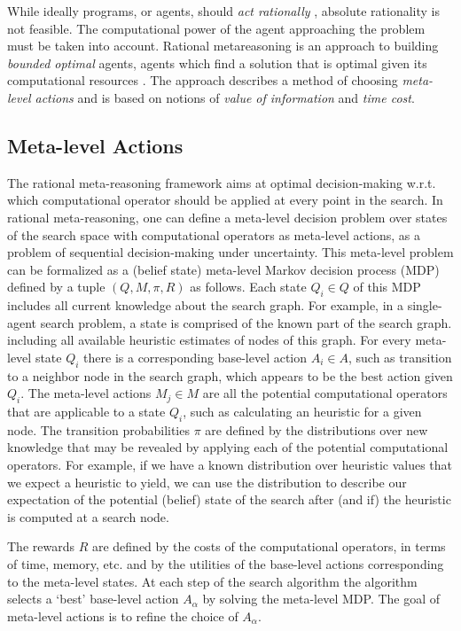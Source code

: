 While ideally programs, or agents, should {\em act rationally}
\cite{Russell.aima}, absolute rationality is not feasible. The
computational power of the agent approaching the problem must be taken
into account. Rational metareasoning \cite{Russell.right} is an
approach to building {\em bounded optimal} agents, agents which find a
solution that is optimal given its computational resources
\cite{Horvitz.reasoningabout}. The approach describes a method of
choosing {\em meta-level actions} and is based on notions of {\em
value of information} and {\em time cost}.

\subsection{Meta-level Actions}

The rational meta-reasoning framework aims at optimal
decision-making w.r.t. which computational operator should be applied
at every point in the search. In rational meta-reasoning, one can
define a meta-level decision problem over states of the search space
with computational operators as meta-level actions, as a problem of
sequential decision-making under uncertainty. This meta-level problem
can be formalized as a (belief state) meta-level Markov decision
process (MDP) defined by a tuple $(Q, M, \pi, R)$ as follows. Each
state $Q_i \in Q$ of this MDP includes all current knowledge about the
search graph. For example, in a single-agent search problem, a state
is comprised of the known part of the search graph. including all
available heuristic estimates of nodes of this graph. For every
meta-level state $Q_i$ there is a corresponding base-level action
$A_i \in A$, such as transition to a neighbor node in the search graph, which
appears to be the best action given $Q_i$. The
meta-level actions $M_j \in M$ are all the potential computational
operators that are applicable to a state $Q_i$, such as calculating an
heuristic for a given node. The transition probabilities $\pi$ are
defined by the distributions over new knowledge that may be revealed
by applying each of the potential computational operators.  For
example, if we have a known distribution over heuristic values that we
expect a heuristic to yield, we can use the distribution to describe
our expectation of the potential (belief) state of the search after
(and if) the heuristic is computed at a search node.

The rewards $R$ are defined by the costs of the computational
operators, in terms of time, memory, etc. and by the utilities of the
base-level actions corresponding to the meta-level states.
At each step of the search algorithm the algorithm selects a
`best' base-level action $A_\alpha$ by solving the meta-level MDP.
The goal of meta-level actions is to refine the choice of $A_\alpha$.

